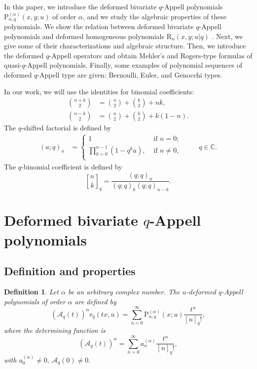 \documentclass[12pt]{article}
\newcommand{\qbinom}{\genfrac{[}{]}{0pt}{}}
\newcommand{\C}{\mathbb{C}}
\newcommand{\e}{\mathrm{e}}
\newcommand{\A}{\mathcal{A}}
\newcommand{\p}{\mathrm{P}}
\newcommand{\rr}{\mathrm{R}}
\newtheorem{definition}{Definition}
\begin{document}
In this paper, we introduce the deformed bivariate $q$-Appell polynomials $\p_{n,q}^{(\alpha)}(x,y;u)$ of order $\alpha$, and we study the algebraic properties of these polynomials. We show the relation between deformed bivariate $q$-Appell polynomials and deformed homogeneous polynomials $\rr_{n}(x,y;u|q)$ \cite{orozco}. Next, we give some of their characterizations and algebraic structure. Then, we introduce the deformed $q$-Appell operators and obtain Mehler's and Rogers-type formulas of quasi-$q$-Appell polynomials. Finally, some examples of polynomial sequences of deformed $q$-Appell type are given: Bernoulli, Euler, and Genocchi types.

In our work, we will use the identities for binomial coefficients:
\begin{align*}
    \binom{n+k}{2}&=\binom{n}{2}+\binom{k}{2}+nk,\\
    \binom{n-k}{2}&=\binom{n}{2}+\binom{k}{2}+k(1-n).
\end{align*}
The $q$-shifted factorial is defined by
\begin{align*}
    (a;q)_{n}&=\begin{cases}
        1&\text{ if }n=0;\\
    \prod_{k=0}^{n-1}(1-q^{k}a),&\text{ if }n\neq0,\\
    \end{cases}\hspace{1cm}q\in\C.
\end{align*}
The $q$-binomial coefficient is defined by
\begin{equation*}
\qbinom{n}{k}_{q}=\frac{(q;q)_{n}}{(q;q)_{k}(q;q)_{n-k}}.
\end{equation*}


\section{Deformed bivariate $q$-Appell polynomials}

\subsection{Definition and properties}

\begin{definition}
Let $\alpha$ be an arbitrary complex number. The $u$-deformed $q$-Appell polynomials of order $\alpha$ are defined by
\begin{equation}\label{eqn_def_uqApp1}
    (\A_{q}(t))^{\alpha}\e_{q}(tx,u)=\sum_{n=0}^{\infty}\p_{n,q}^{(\alpha)}(x;u)\frac{t^{n}}{[n]_{q}!},
\end{equation}
where the determining function is 
\begin{equation}
    (\A_{q}(t))^{\alpha}=\sum_{n=0}^{\infty}a_{n}^{(\alpha)}\frac{t^n}{[n]_{q}!},
\end{equation}
with $a_{0}^{(\alpha)}\neq0,\ \A_{q}(0)\neq0.$
\end{definition}
\end{document}
